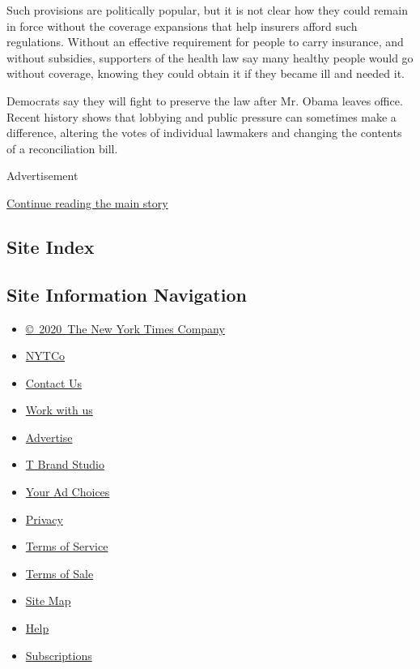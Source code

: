 Such provisions are politically popular, but it is not clear how they
could remain in force without the coverage expansions that help insurers
afford such regulations. Without an effective requirement for people to
carry insurance, and without subsidies, supporters of the health law say
many healthy people would go without coverage, knowing they could obtain
it if they became ill and needed it.

Democrats say they will fight to preserve the law after Mr. Obama leaves
office. Recent history shows that lobbying and public pressure can
sometimes make a difference, altering the votes of individual lawmakers
and changing the contents of a reconciliation bill.

Advertisement

\protect\hyperlink{after-bottom}{Continue reading the main story}

\hypertarget{site-index}{%
\subsection{Site Index}\label{site-index}}

\hypertarget{site-information-navigation}{%
\subsection{Site Information
Navigation}\label{site-information-navigation}}

\begin{itemize}
\tightlist
\item
  \href{https://help.nytimes.com/hc/en-us/articles/115014792127-Copyright-notice}{©~2020~The
  New York Times Company}
\end{itemize}

\begin{itemize}
\tightlist
\item
  \href{https://www.nytco.com/}{NYTCo}
\item
  \href{https://help.nytimes.com/hc/en-us/articles/115015385887-Contact-Us}{Contact
  Us}
\item
  \href{https://www.nytco.com/careers/}{Work with us}
\item
  \href{https://nytmediakit.com/}{Advertise}
\item
  \href{http://www.tbrandstudio.com/}{T Brand Studio}
\item
  \href{https://www.nytimes.com/privacy/cookie-policy\#how-do-i-manage-trackers}{Your
  Ad Choices}
\item
  \href{https://www.nytimes.com/privacy}{Privacy}
\item
  \href{https://help.nytimes.com/hc/en-us/articles/115014893428-Terms-of-service}{Terms
  of Service}
\item
  \href{https://help.nytimes.com/hc/en-us/articles/115014893968-Terms-of-sale}{Terms
  of Sale}
\item
  \href{https://spiderbites.nytimes.com}{Site Map}
\item
  \href{https://help.nytimes.com/hc/en-us}{Help}
\item
  \href{https://www.nytimes.com/subscription?campaignId=37WXW}{Subscriptions}
\end{itemize}
